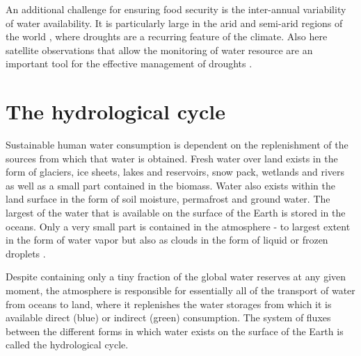 An additional challenge for ensuring food security is the inter-annual
variability of water availability. It is particularly large in the arid and
semi-arid regions of the world \citep{falkenmark04}, where droughts are a
recurring feature of the climate. Also here satellite observations that allow
the monitoring of water resource are an important tool for the effective
management of droughts \citep{boyd13}.

%
%


\section{The hydrological cycle}

Sustainable human water consumption is dependent on the replenishment of the
sources from which that water is obtained. Fresh water over land exists in the
form of glaciers, ice sheets, lakes and reservoirs, snow pack, wetlands and
rivers as well as a small part contained in the biomass. Water also exists
within the land surface in the form of soil moisture, permafrost and ground
water. The largest of the water that is available on the surface of the Earth is
stored in the oceans. Only a very small part is contained in the atmosphere - to
largest extent in the form of water vapor but also as clouds in the form of
liquid or frozen droplets \citep{abbott19}.

Despite containing only a tiny fraction of the global water reserves at any
given moment, the atmosphere is responsible for essentially all of the transport
of water from oceans to land, where it replenishes the water storages from which
it is available direct (blue) or indirect (green) consumption. The system of
fluxes between the different forms in which water exists on the surface of the
Earth is called  the hydrological cycle.

